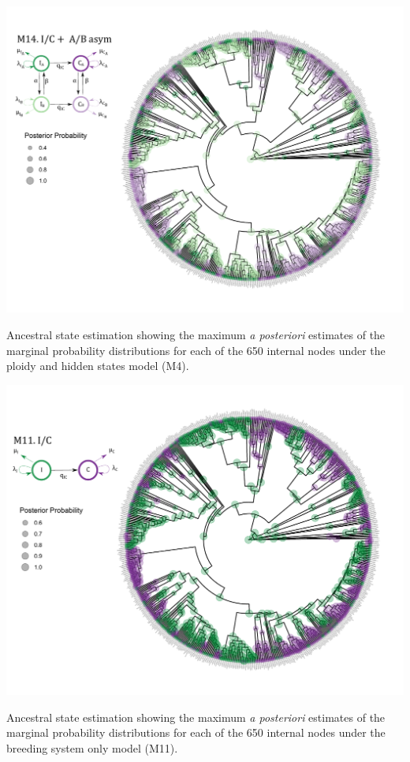 \begin{suppfigure}
\includegraphics[width=\textwidth]{figS12.pdf}
\caption{Ancestral state estimation showing the maximum \emph{a posteriori} estimates of the marginal probability distributions for each of the 650 internal nodes under the ploidy and hidden states model (M4).} %
\label{suppfigure:DPnodipABasr}
\end{suppfigure}


\begin{suppfigure}
\includegraphics[width=\textwidth]{figS11.pdf}
\caption{Ancestral state estimation showing the maximum \emph{a posteriori} estimates of the marginal probability distributions for each of the 650 internal nodes under the  breeding system only model (M11).} %
\label{suppfigure:ICasr}
\end{suppfigure}



